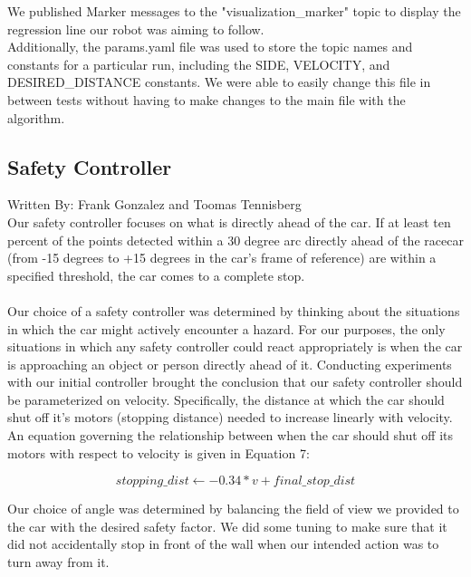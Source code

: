\documentclass{article}
\begin{document}
We published Marker messages to the "visualization\_marker" topic to display the regression line our robot was aiming to follow. \\

Additionally, the params.yaml file was used to store the topic names and constants for a particular run, including the SIDE, VELOCITY, and DESIRED\_DISTANCE constants. We were able to easily change this file in between tests without having to make changes to the main file with the algorithm. \\

\subsection{Safety Controller}
Written By: Frank Gonzalez and Toomas Tennisberg\\

Our safety controller focuses on what is directly ahead of the car. If at least ten percent of the points detected within a 30 degree arc directly ahead of the racecar (from -15 degrees to +15 degrees in the car's frame of reference) are within a specified threshold, the car comes to a complete stop.\\\\
Our choice of a safety controller was determined by thinking about the situations in which the car might actively encounter a hazard. For our purposes, the only situations in which any safety controller could react appropriately is when the car is approaching an object or person directly ahead of it. Conducting experiments with our initial controller brought the conclusion that our safety controller should be parameterized on velocity. Specifically, the distance at which the car should shut off it's motors (stopping distance) needed to increase linearly with velocity. An equation governing the relationship between when the car should shut off its motors with respect to velocity is given in Equation 7:

\begin{equation}
    stopping\_dist \leftarrow -0.34 * v + final\_stop\_dist
\end{equation}

Our choice of angle was determined by balancing the field of view we provided to the car with the desired safety factor. We did some tuning to make sure that it did not accidentally stop in front of the wall when our intended action was to turn away from it.\\
\end{document}

